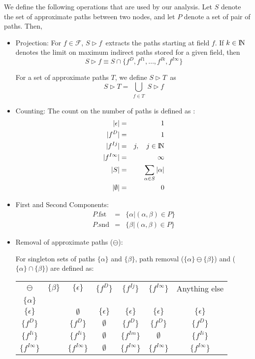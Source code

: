 \documentclass[runningheads,a4paper]{llncs}
\newcommand{\drct}{\ensuremath{D}}
\newcommand{\indrct}{\ensuremath{I}}
\newcommand{\fields}{\ensuremath{\mathcal{F}}}
\newcommand{\nat}{\ensuremath{\bbbn}}
\newcommand{\project}[2]{\ensuremath{#1\triangleright\!\!#2}}
\newcommand{\num}[1]{\ensuremath{|#1|}}
\newcommand{\first}[1]{\ensuremath{#1. \mathrm{fst}}}
\newcommand{\second}[1]{\ensuremath{#1. \mathrm{snd}}}
\newcommand{\remOne}[2]{\ensuremath{#1 \ominus #2}}
\begin{document}
We define the following operations that are used by our
analysis. Let $S$ denote the set of approximate paths between
two nodes, and let $P$ denote a set of pair of paths. Then,
\begin{itemize}
\item Projection: For $f \in \fields$,
  \project{S}{f}\ extracts the paths starting at field $f$.
  If $k \in \nat$ denotes the limit on maximum indirect paths stored
  for a given field, then
$$\project{S}{f} \equiv S \cap \{f^{\drct}, f^{\indrct 1}, \ldots,
  f^{\indrct k}, f^{\indrct \infty}\}$$

{\red For a set of approximate paths $T$, we define \project{S}{T}\ as
$$\project{S}{T}  = \displaystyle\bigcup_{\substack{ f \in T}} \project{S}{f}$$ 
}
\item Counting: The count on the number of paths is defined
  as :
  \begin{eqnarray*}
   \num{\epsilon} &=&     1 \\
   \num{f^{\drct}} &=&     1 \\
   \num{f^{\indrct j}} &=&  j, \quad j \in \nat \\
   \num{f^{\indrct\infty}} &=&     \infty \\
   \num{S} &=&   \sum_{\alpha \in S}\num{\alpha} \\
	\num{\emptyset} &=& 0
  \end{eqnarray*}
\item First and Second Components: 
  \begin{eqnarray*}
 \first{P}     &=&  \{\alpha \vert (\alpha, \beta) \in P\}\\
 \second{P} &=& \{\beta \vert (\alpha, \beta) \in P\}
  \end{eqnarray*}

\item Removal of approximate paths (\remOne{}{}): {\red For
  singleton sets of paths $\{\alpha\}$ and $\{\beta\}$, path
  removal (\remOne{\{\alpha\}}{\{\beta\}}) and ($\{\alpha\} \cap \{\beta\}$) are defined as:

\begin{center}
\renewcommand{\arraystretch}{1.1}
  \begin{tabular}{|cc|c|c|c|c|c|} \hline
    \remOne{}{}&$\{\beta\} $& $\{\epsilon\}$ &
    $\{f^{\drct}\}$ & $\{f^{\indrct j}\}$&
    $\{f^{\indrct\infty}\}$ & Anything else \\
    $\{\alpha\}$ && & & & & \\ \hline \hline
    $\{\epsilon\}$ && $\emptyset$  & $\{\epsilon\}$ &
    $\{\epsilon\}$ & $\{\epsilon\}$ & $\{\epsilon\}$ \\ \hline
    $\{f^{\drct}\}$ && $\{f^{\drct}\}$ & $\emptyset$ &
    $\{f^{\drct}\}$ & $\{f^{\drct}\}$ & $\{f^{\drct}\}$ \\ \hline
    $\{f^{\indrct i}\}$ && $\{f^{\indrct i}\}$ & $\emptyset$
    & $\{f^{\indrct m}\}$& $\emptyset$ & $\{f^{\indrct i}\}$ \\ \hline
    $\{f^{\indrct\infty}\}$ && $\{f^{\indrct\infty}\}$
    &$\emptyset$ & $\{f^{\indrct \infty}\}$& $\{f^{\indrct
      \infty}\}$ & $\{f^{\indrct\infty}\}$ \\ \hline
  \end{tabular} 


\end{center}}
\end{itemize}
\end{document}
